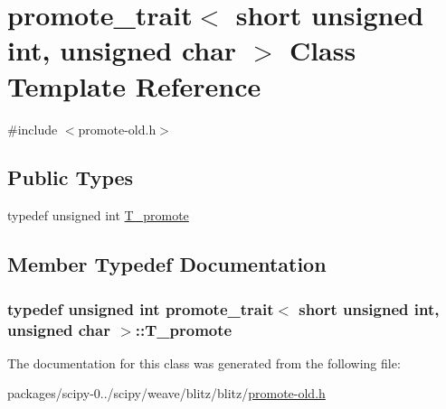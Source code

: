 \hypertarget{classpromote__trait_3_01short_01unsigned_01int_00_01unsigned_01char_01_4}{}\section{promote\+\_\+trait$<$ short unsigned int, unsigned char $>$ Class Template Reference}
\label{classpromote__trait_3_01short_01unsigned_01int_00_01unsigned_01char_01_4}


{\ttfamily \#include $<$promote-\/old.\+h$>$}

\subsection*{Public Types}
\begin{DoxyCompactItemize}
\item 
typedef unsigned int \hyperlink{classpromote__trait_3_01short_01unsigned_01int_00_01unsigned_01char_01_4_a8db45ced534fb35753f6ea4f60c6ddc0}{T\+\_\+promote}
\end{DoxyCompactItemize}


\subsection{Member Typedef Documentation}
\hypertarget{classpromote__trait_3_01short_01unsigned_01int_00_01unsigned_01char_01_4_a8db45ced534fb35753f6ea4f60c6ddc0}{}
\subsubsection[{T\+\_\+promote}]{\setlength{\rightskip}{0pt plus 5cm}typedef unsigned int {\bf promote\+\_\+trait}$<$ short unsigned int, unsigned char $>$\+::{\bf T\+\_\+promote}}\label{classpromote__trait_3_01short_01unsigned_01int_00_01unsigned_01char_01_4_a8db45ced534fb35753f6ea4f60c6ddc0}


The documentation for this class was generated from the following file\+:\begin{DoxyCompactItemize}
\item 
packages/scipy-\/0../scipy/weave/blitz/blitz/\hyperlink{promote-old_8h}{promote-\/old.\+h}\end{DoxyCompactItemize}

